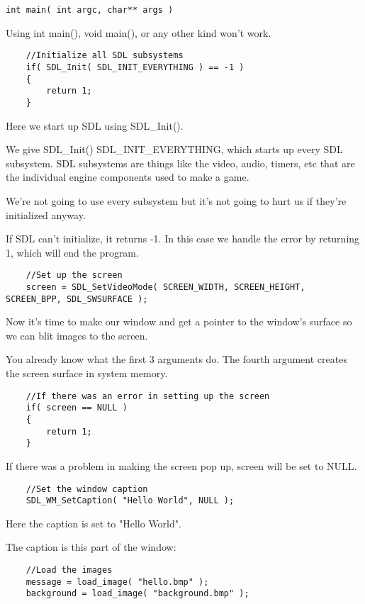 \begin{verbatim}
int main( int argc, char** args )
\end{verbatim}

Using int main(), void main(), or any other kind won't work.

\begin{verbatim}
    //Initialize all SDL subsystems
    if( SDL_Init( SDL_INIT_EVERYTHING ) == -1 )
    {
        return 1;
    }
\end{verbatim}

Here we start up SDL using SDL\_Init().

We give SDL\_Init() SDL\_INIT\_EVERYTHING, which starts up every SDL subsystem.
SDL subsystems are things like the video, audio, timers, etc that are the
individual engine components used to make a game.

We're not going to use every subsystem but it's not going to hurt us if they're
initialized anyway.

If SDL can't initialize, it returns -1. In this case we handle the error by
returning 1, which will end the program.

\begin{verbatim}
    //Set up the screen
    screen = SDL_SetVideoMode( SCREEN_WIDTH, SCREEN_HEIGHT, SCREEN_BPP, SDL_SWSURFACE );
\end{verbatim}

Now it's time to make our window and get a pointer to the window's surface so
we can blit images to the screen.

You already know what the first 3 arguments do. The fourth argument creates the
screen surface in system memory.

\begin{verbatim}
    //If there was an error in setting up the screen
    if( screen == NULL )
    {
        return 1;
    }
\end{verbatim}

If there was a problem in making the screen pop up, screen will be set to NULL.

\begin{verbatim}
    //Set the window caption
    SDL_WM_SetCaption( "Hello World", NULL );
\end{verbatim}

Here the caption is set to "Hello World".

The caption is this part of the window:

\begin{verbatim}
    //Load the images
    message = load_image( "hello.bmp" );
    background = load_image( "background.bmp" );
\end{verbatim}

